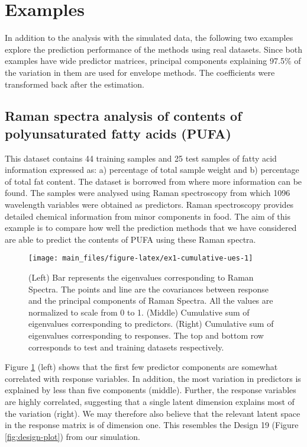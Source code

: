 \documentclass[review]{elsarticle}
\begin{document}
\hypertarget{examples}{%
\section{Examples}\label{examples}}

In addition to the analysis with the simulated data, the following two examples explore the prediction performance of the methods using real datasets. Since both examples have wide predictor matrices, principal components explaining 97.5\% of the variation in them are used for envelope methods. The coefficients were transformed back after the estimation.

\hypertarget{raman-spectra-analysis-of-contents-of-polyunsaturated-fatty-acids-pufa}{%
\subsection{Raman spectra analysis of contents of polyunsaturated fatty acids (PUFA)}\label{raman-spectra-analysis-of-contents-of-polyunsaturated-fatty-acids-pufa}}

This dataset contains 44 training samples and 25 test samples of fatty acid information expressed as: a) percentage of total sample weight and b) percentage of total fat content. The dataset is borrowed from \citet{naes2013multi} where more information can be found. The samples were analysed using Raman spectroscopy from which 1096 wavelength variables were obtained as predictors. Raman spectroscopy provides detailed chemical information from minor components in food. The aim of this example is to compare how well the prediction methods that we have considered are able to predict the contents of PUFA using these Raman spectra.



\begin{figure}
\texttt{[image: main\_files/figure-latex/ex1-cumulative-ues-1]} \caption{(Left) Bar represents the eigenvalues corresponding to Raman Spectra. The points and line are the covariances between response and the principal components of Raman Spectra. All the values are normalized to scale from 0 to 1. (Middle) Cumulative sum of eigenvalues corresponding to predictors. (Right) Cumulative sum of eigenvalues corresponding to responses. The top and bottom row corresponds to test and training datasets respectively.}\label{fig:ex1-cumulative-ues}
\end{figure}

Figure \ref{fig:ex1-cumulative-ues} (left) shows that the first few predictor components are somewhat correlated with response variables. In addition, the most variation in predictors is explained by less than five components (middle). Further, the response variables are highly correlated, suggesting that a single latent dimension explains most of the variation (right). We may therefore also believe that the relevant latent space in the response matrix is of dimension one. This resembles the Design 19 (Figure \ref{fig:design-plot}) from our simulation.
\end{document}
